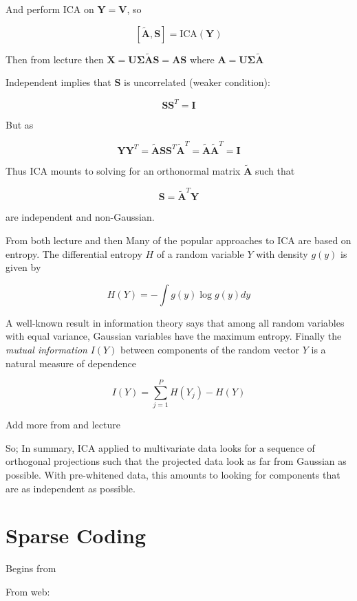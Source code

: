 And perform ICA on $\bm{Y} = \bm{V}$, so

\[
    [\bm{\tilde{A}, \bm{S}}] = \text{ICA}(\bm{Y})
\]

Then from lecture \cite[p.~22]{lecture10} then $\bm{X} = \bm{U} \bm{\Sigma} \bm{\tilde{A}} \bm{S} = \bm{A} \bm{S}$ where $\bm{A} = \bm{U}  \bm{\Sigma} \bm{\tilde{A}}$

Independent implies that $\bm{S}$ is uncorrelated (weaker condition):

\[
    \bm{S}\bm{S}^T = \bm{I}
\]

But as

\[
    \bm{Y}\bm{Y}^T = \bm{\tilde{A}}\bm{S}\bm{S}^T\bm{\tilde{A}}^T = \bm{\tilde{A}}\bm{\tilde{A}}^T = \bm{I}
\]

Thus ICA mounts to solving for an orthonormal matrix $\bm{\tilde{A}}$  such that

\[
    \bm{S} = \bm{\tilde{A}}^T \bm{Y}
\]

are independent and non-Gaussian.

From both lecture \cite[p.~22-24]{lecture10} and \cite[p.~561]{friedman2016elements} then Many of the popular approaches to ICA are based on entropy. The differential entropy $H$ of a random variable $Y$ with density $g(y)$ is given by

\[
    H(Y) = - \int g(y) \log g(y) dy
\]

A well-known result in information theory says that among all random variables with equal variance, Gaussian variables have the maximum entropy. Finally the \textit{mutual information} $I(Y)$ between components of the random vector $Y$ is a natural measure of dependence

\[
    I(Y) = \sum_{j=1}^{P} H(Y_j) - H(Y)
\]

Add more from \cite[p.~561-562]{friedman2016elements} and lecture \cite[p.~24]{lecture10}

So; In summary, ICA applied to multivariate data looks for a sequence of orthogonal projections such that the projected data look as far from Gaussian as possible. With pre-whitened data, this amounts to looking for components that are as independent as possible.

\section{Sparse Coding}

Begins from \cite[p.~33]{lecture10}

From web:

